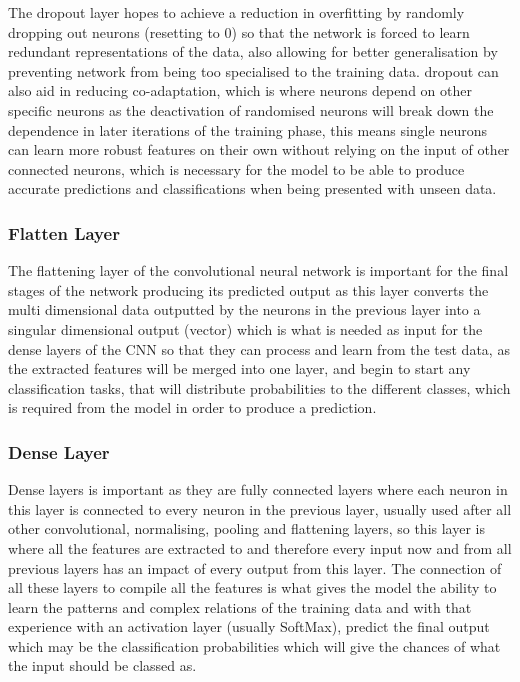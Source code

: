 \documentclass[]{final_report}
\begin{document}
The dropout layer hopes to achieve a reduction in overfitting by randomly dropping out neurons (resetting to 0) so that the network is forced to learn redundant representations of the data, also allowing for better generalisation by preventing network from being too specialised to the training data. dropout can also aid in reducing co-adaptation, which is where neurons depend on other specific neurons as the deactivation of randomised neurons will break down the dependence in later iterations of the training phase, this means single neurons can learn more robust features on their own without relying on the input of other connected neurons, which is necessary for the model to be able to produce accurate predictions and classifications when being presented with unseen data.\cite{UpGrad2025}

\subsubsection{Flatten Layer}

The flattening layer of the convolutional neural network is important for the final stages of the network producing its predicted output as this layer converts the multi dimensional data outputted by the neurons in the previous layer into a singular dimensional output (vector) which is what is needed as input for the dense layers of the CNN so that they can process and learn from the test data, as the extracted features will be merged into one layer, and begin to start any classification tasks, that will distribute probabilities to the different classes, which is required from the model in order to produce a prediction.\cite{UpGrad2025}

\subsubsection{Dense Layer}

Dense layers is important as they are fully connected layers where each neuron in this layer is connected to every neuron in the previous layer, usually used after all other convolutional, normalising, pooling  and flattening layers, so this layer is where all the features are extracted to and therefore every input now and from all previous layers has an impact of every output from this layer. The connection of all these layers to compile all the features is what gives the model the ability to learn the patterns and complex relations of the training data and with that experience with an activation layer (usually SoftMax), predict the final output which may be the classification probabilities which will give the chances of what the input should be classed as.\cite{UpGrad2025}
\end{document}
